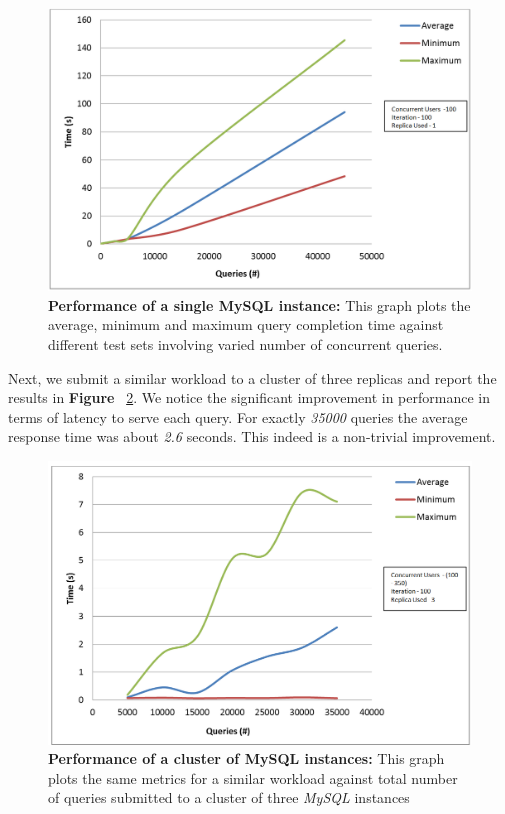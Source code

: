 \documentclass[12pt]{article}
\begin{document}
\begin{figure}[H] 
\centering
\includegraphics[scale=0.45]{Images/graph_singlereplica.PNG}
\caption{\textbf{Performance of a single MySQL instance:} This graph plots the
average, minimum and maximum query completion time against different test sets
involving varied number of concurrent queries. } \label{fig:singlereplica}
\end{figure} 
Next, we submit a similar workload to a cluster of three replicas
and report the results in \textbf{Figure }~\ref{fig:scaling}. We notice the
significant improvement in performance in terms of latency to serve each query.
For exactly \emph{35000} queries the average response time was about \emph{2.6}
seconds. This indeed is a non-trivial improvement.  
\begin{figure}[H] 
\centering
\includegraphics[scale=0.45]{Images/graph_scaling.PNG}
\caption{\textbf{Performance of a cluster of MySQL instances:} This graph plots
the same metrics for a similar workload against total number of queries
submitted to a cluster of three \emph{MySQL} instances } 
\label{fig:scaling}
\end{figure} 
\end{document}
